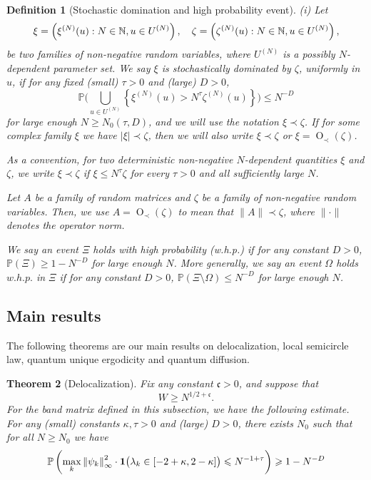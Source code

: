 \documentclass[10pt,reqno]{article}
\def\P{\mathbb{P}}
\DeclareMathOperator{\OO}{O}
\theoremstyle{plain} %
\newtheorem{theorem}{Theorem}[section]
\newtheorem{definition}[theorem]{Definition}
\theoremstyle{remark}
\numberwithin{equation}{section}
\begin{document}
\begin{definition}[Stochastic domination and high probability event]\label{stoch_domination}
	{\rm{(i)}} Let
	\[\xi=\left(\xi^{(N)}(u):N\in\mathbb N, u\in U^{(N)}\right),\hskip 10pt \zeta=\left(\zeta^{(N)}(u):N\in\mathbb N, u\in U^{(N)}\right),\]
	be two families of non-negative random variables, where $U^{(N)}$ is a possibly $N$-dependent parameter set. We say $\xi$ is stochastically dominated by $\zeta$, uniformly in $u$, if for any fixed (small) $\tau>0$ and (large) $D>0$, 
	\[\mathbb P\bigg(\bigcup_{u\in U^{(N)}}\left\{\xi^{(N)}(u)>N^\tau\zeta^{(N)}(u)\right\}\bigg)\le N^{-D}\]
	for large enough $N\ge N_0(\tau, D)$, and we will use the notation $\xi\prec\zeta$. 
		If for some complex family $\xi$ we have $|\xi|\prec\zeta$, then we will also write $\xi \prec \zeta$ or $\xi=\OO_\prec(\zeta)$. 
	
	\vspace{5pt}
	 As a convention, for two deterministic non-negative \(N\)-dependent quantities \(\xi\) and \(\zeta\),
we write \(\xi\prec\zeta\) if \(\xi\le N^\tau\zeta\) for every \(\tau>0\)
and all sufficiently large \(N\).

 \vspace{5pt}
	 Let $A$ be a family of random matrices and $\zeta$ be a family of non-negative random variables. Then, we use $A=\OO_\prec(\zeta)$ to mean that $\|A\|\prec \zeta$, where $\|\cdot\|$ denotes the operator norm. 
	
	\vspace{5pt}
	 We say an event $\Xi$ holds with high probability (w.h.p.) if for any constant $D>0$, $\mathbb P(\Xi)\ge 1- N^{-D}$ for large enough $N$. More generally, we say an event $\Omega$ holds $w.h.p.$ in $\Xi$ if for any constant $D>0$,
	$\P( \Xi\setminus \Omega)\le N^{-D}$ for large enough $N$.
\end{definition}

\subsection{Main results}

The following theorems are our main results on delocalization,  local semicircle law, quantum unique ergodicity and quantum diffusion.

\begin{theorem}[Delocalization]\label{MR:decol}
Fix any constant $\mathfrak c>0$, and suppose that
\begin{equation}\label{Main_DEL_COND}
    W \ge N^{1/2+\mathfrak c}.
\end{equation}
For the band matrix defined in this subsection, we have the following estimate.
For any (small) constants $\kappa, \tau>0$ and (large) $D>0$, there exists $N_0$ such that for all $N \geqslant N_0$ we have
$$
\mathbb{P}\left( \max_k\left\|\psi_k\right\|_{\infty}^2 \cdot {\bf1}\big(\lambda_k\in[-2+\kappa,2-\kappa]\big)\leqslant N^{-1+\tau}  \right) \geqslant 1-N^{-D}
$$
\end{theorem}
\end{document}
